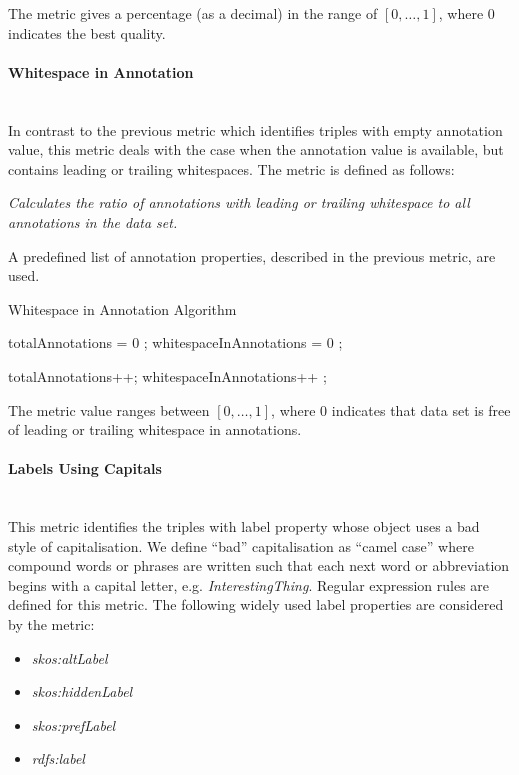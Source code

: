 The metric gives a percentage (as a decimal) in the range of $[0,\ldots,1]$, where 0 indicates the best quality.

\paragraph{Whitespace in Annotation}~\\
In contrast to the previous metric which identifies triples with empty annotation value, this metric deals with the case when the annotation value is available, but contains leading or trailing whitespaces.
The metric is defined as follows:

\begin{mdframed}[style=metricdefinition]
\emph{Calculates the ratio of annotations with leading or trailing whitespace to all annotations in the data set.}
\end{mdframed}

A predefined list of annotation properties, described in the previous metric, are used. 

\begin{algorithm}
\caption{Whitespace in Annotation Algorithm}\label{lst:whitespace}
\begin{algorithmic}[1]
\State totalAnnotations = 0 ;
\State whitespaceInAnnotations = 0 ;
\EndProcedure

 totalAnnotations++; \EndIf
{} whitespaceInAnnotations++ ; \EndIf
\EndProcedure
\end{algorithmic}
\end{algorithm}

The metric value ranges between $[0,\ldots,1]$, where  0 indicates that data set is free of leading or trailing whitespace in annotations.

\paragraph{Labels Using Capitals}~\\
This metric identifies the triples with label property whose object uses a bad style of capitalisation. 
We define ``bad'' capitalisation as ``camel case'' where compound words or phrases  are written such that each next word or abbreviation begins with a capital letter, e.g. \textit{InterestingThing}.
Regular expression rules are defined for this metric.
The following widely used label properties are considered by the metric:
\begin{itemize}
\item \textit{skos:altLabel}
\item \textit{skos:hiddenLabel}
\item \textit{skos:prefLabel}
\item \textit{rdfs:label}
\end{itemize}

